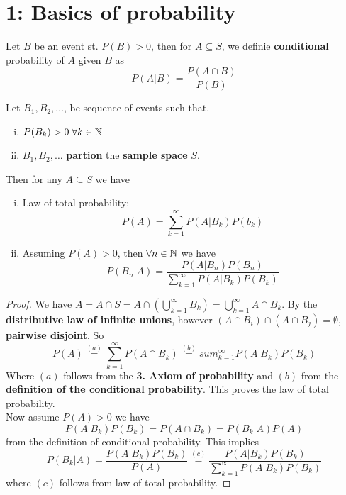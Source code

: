 \chapter{1: Basics of probability}
\begin{definition}
  Let $B$ be an event st. $P(B) > 0$, then for $A \subseteq S$, we definie \textbf{conditional} probability of $A$ given $B$ as
  \begin{equation*}
    P(A | B) = \frac{P(A \cap B)}{P(B)}
  \end{equation*}
\end{definition}

\begin{theorem}
  Let $B_{1}, B_{2}, \ldots$, be sequence of events such that.
  \begin{enumerate}[i)]
    \item $P(B_k) > 0 \; \forall k \in \mathbb{N}$
        \item $B_{1}, B_{2}, \ldots$ \textbf{partion} the \textbf{sample space} $S$.
  \end{enumerate}
  Then for any $A \subseteq S$ we have
  \begin{enumerate}[i)]
    \item Law of total probability:
      \begin{equation*}
          P(A) = \sum_{k=1}^{\infty}P(A | B_{k}) P(b_{k})
      \end{equation*}
    \item Assuming $P(A) > 0$, then $\forall n \in \mathbb{N}$ we have
      \begin{equation*}
        P(B_{n} | A) = \frac{P(A|B_{n})P(B_{n})}{\sum_{k=1}^{\infty} P(A|B_{k})P(B_{k})}
      \end{equation*}
  \end{enumerate}
\end{theorem}
\begin{proof}
  We have $A = A \cap S = A \cap \left( \bigcup_{k=1}^{\infty} B_{k} \right) = \bigcup_{k=1}^{\infty} A \cap B_{k}$.
  By the \textbf{distributive law of infinite unions}, however $(A \cap B_{i}) \cap (A \cap B_{j}) = \emptyset$, \textbf{pairwise disjoint}. So
  \begin{equation*}
    P(A) \stackrel{(a)}= \sum_{k=1}^{\infty} P(A \cap B_{k}) \stackrel{(b)}= sum_{k=1}^{\infty} P(A | B_{k}) P(B_{k})
  \end{equation*}
  Where $(a)$ follows from the \textbf{3. Axiom of probability} and $(b)$ from the \textbf{definition of the conditional probability}. This proves the law of total probability. \\
  Now assume $P(A) > 0$ we have
  \begin{equation*}
    P(A | B_{k}) P(B_{k}) = P(A \cap B_{k}) = P(B_{k} | A)P(A)
  \end{equation*}
  from the definition of conditional probability. This implies
  \begin{equation*}
    P(B_{k} | A) = \frac{P(A | B_{k})P(B_{k})}{P(A)} \stackrel{(c)}= \frac{P(A | B_{k})P(B_{k})}{\sum_{k=1}^{\infty} P(A | B_{k})P(B_{k})}
  \end{equation*}
  where $(c)$ follows from law of total probability.
\end{proof}
